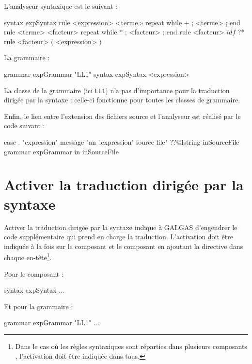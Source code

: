 L'analyseur syntaxique est le suivant :
\begin{galgascode}
syntax expSyntax {
  rule <expression> {
    <terme>
    repeat while $+$ ; <terme> ; end
  }
  rule <terme> {
    <facteur>
    repeat while $*$ ; <facteur> ; end
  }
  rule <facteur> {
    $idf$ ?*
  }
  rule <facteur> {
    $($
    <expression>
    $)$
  }
}
\end{galgascode}

La grammaire :
\begin{galgascode}
grammar expGrammar "LL1" {
  syntax expSyntax
  <expression>
}
\end{galgascode}

La classe de la grammaire (ici \texttt{LL1}) n'a pas d'importance pour la traduction dirigée par la syntaxe : celle-ci fonctionne pour toutes les classes de grammaire. 

Enfin, le lien entre l'extension des fichiers source et l'analyseur est réalisé par le code suivant :
\begin{galgascode}
case . "expression"
message "an '.expression' source file"
??@lstring inSourceFile {
  grammar expGrammar in inSourceFile
}
\end{galgascode}








\section{Activer la traduction dirigée par la syntaxe}

Activer la traduction dirigée par la syntaxe indique à GALGAS d'engendrer le code supplémentaire qui prend en charge la traduction. L'activation doit être indiquée à la fois sur le composant  et le composant  en ajoutant la directive  dans chaque en-tête\footnote{Dans le cas où les règles syntaxiques sont réparties dans plusieurs composants , l'activation doit être indiquée dans tous.}.

Pour le composant  :
\begin{galgascode}
syntax expSyntax %
  ...
\end{galgascode}

Et pour la grammaire :
\begin{galgascode}
grammar expGrammar "LL1" %
  ...
\end{galgascode}

